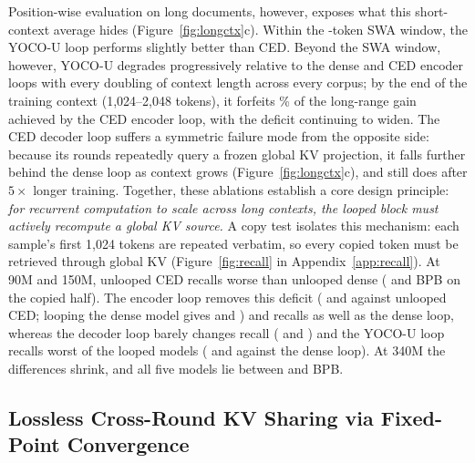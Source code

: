 Position-wise evaluation on long documents, however, exposes what this short-context average hides (Figure~\ref{fig:longctx}c). Within the -token SWA window, the YOCO-U loop performs slightly better than CED. Beyond the SWA window, however, YOCO-U degrades progressively relative to the dense and CED encoder loops with every doubling of context length across every corpus; by the end of the training context (1,024--2,048 tokens), it forfeits \% of the long-range gain achieved by the CED encoder loop, with the deficit continuing to widen. The CED decoder loop suffers a symmetric failure mode from the opposite side: because its rounds repeatedly query a frozen global KV projection, it falls further behind the dense loop as context grows (Figure~\ref{fig:longctx}c), and still does after $5\times$ longer training. Together, these ablations establish a core design principle: \textit{for recurrent computation to scale across long contexts, the looped block must actively recompute a global KV source.} A copy test isolates this mechanism: each sample's first 1,024 tokens are repeated verbatim, so every copied token must be retrieved through global KV (Figure~\ref{fig:recall} in Appendix~\ref{app:recall}).
At 90M and 150M, unlooped CED recalls worse than unlooped dense ( and  BPB on the copied half). The encoder loop removes this deficit ( and  against unlooped CED; looping the dense model gives  and ) and recalls as well as the dense loop, whereas the decoder loop barely changes recall ( and ) and the YOCO-U loop recalls worst of the looped models ( and  against the dense loop). At 340M the differences shrink, and all five models lie between  and  BPB.

\subsection{Lossless Cross-Round KV Sharing via Fixed-Point Convergence}
\label{sec:res-kv}

